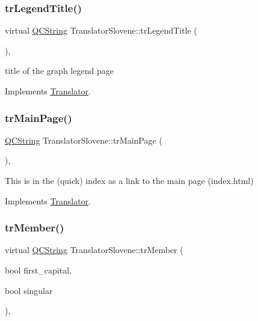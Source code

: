\subsubsection{\texorpdfstring{trLegendTitle()}{trLegendTitle()}}
{\footnotesize\ttfamily virtual \mbox{\hyperlink{class_q_c_string}{Q\+C\+String}} Translator\+Slovene\+::tr\+Legend\+Title (\begin{DoxyParamCaption}{ }\end{DoxyParamCaption})\hspace{0.3cm}{\ttfamily [inline]}, {\ttfamily [virtual]}}

title of the graph legend page 

Implements \mbox{\hyperlink{class_translator}{Translator}}.

\mbox{\label{class_translator_slovene_aab9af959a4ec7611e76d4d725a8eb748}} 
\subsubsection{\texorpdfstring{trMainPage()}{trMainPage()}}
{\footnotesize\ttfamily \mbox{\hyperlink{class_q_c_string}{Q\+C\+String}} Translator\+Slovene\+::tr\+Main\+Page (\begin{DoxyParamCaption}{ }\end{DoxyParamCaption})\hspace{0.3cm}{\ttfamily [inline]}, {\ttfamily [virtual]}}

This is in the (quick) index as a link to the main page (index.\+html) 

Implements \mbox{\hyperlink{class_translator}{Translator}}.

\mbox{\label{class_translator_slovene_a49065c4a9a2eec3961a47bc069f8fcd7}} 
\subsubsection{\texorpdfstring{trMember()}{trMember()}}
{\footnotesize\ttfamily virtual \mbox{\hyperlink{class_q_c_string}{Q\+C\+String}} Translator\+Slovene\+::tr\+Member (\begin{DoxyParamCaption}\item[{bool}]{first\+\_\+capital,  }\item[{bool}]{singular }\end{DoxyParamCaption})\hspace{0.3cm}{\ttfamily [inline]}, {\ttfamily [virtual]}}

